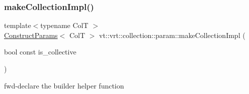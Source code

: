 \subsubsection{\texorpdfstring{make\+Collection\+Impl()}{makeCollectionImpl()}}
{\footnotesize\ttfamily template$<$typename ColT $>$ \\
\hyperlink{structvt_1_1vrt_1_1collection_1_1param_1_1_construct_params}{Construct\+Params}$<$ ColT $>$ vt\+::vrt\+::collection\+::param\+::make\+Collection\+Impl (\begin{DoxyParamCaption}\item[{bool const}]{is\+\_\+collective }\end{DoxyParamCaption})}



fwd-\/declare the builder helper function 

